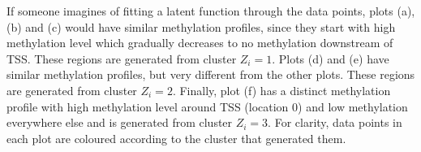 If someone imagines of fitting a latent function through the data points, plots (a), (b) and (c) would have similar methylation profiles, since they start with high methylation level which gradually decreases to no methylation downstream of TSS. These regions are generated from cluster $Z_{i}=1$. Plots (d) and (e) have similar methylation profiles, but very different from the other plots. These regions are generated from cluster $Z_{i}=2$. Finally, plot (f) has a distinct methylation profile with high methylation level around TSS (\ie location 0) and low methylation everywhere else and is generated from cluster $Z_{i}=3$. For clarity, data points in each plot are coloured according to the cluster that generated them.
 
\begin{figure}[ht!]
     \begin{center}
        \subfigure[]{
}
\end{center}
\end{figure}
